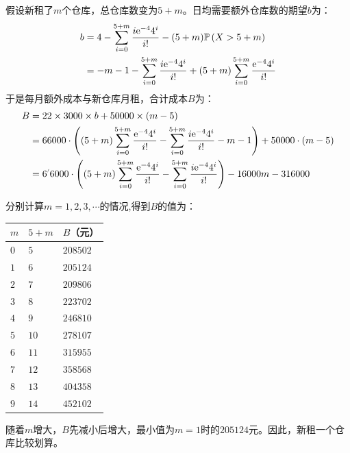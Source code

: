 \documentclass[12pt,UTF8,fontset=none]{ctexbook}
\begin{document}
\begin{so}
    假设新租了$m$个仓库，总仓库数变为$5+m$。日均需要额外仓库数的期望$b$为：
    \begin{align*}
        b &= 4 - \sum_{i=0}^{5+m} \frac{i\mathrm{e}^{-4}4^i}{i!} - (5+m) \mathbb{P}\left(X>5+m\right) \\
        &= -m - 1 - \sum_{i=0}^{5+m} \frac{i\mathrm{e}^{-4}4^i}{i!} + (5+m) \sum_{i=0}^{5+m} \frac{\mathrm{e}^{-4}4^i}{i!}
    \end{align*}
    于是每月额外成本与新仓库月租，合计成本$B$为：
    \begin{align*}
        B =\; & 22 \times 3000 \times b + 50000 \times (m - 5) \\
        =\;& 66000\cdot \left( (5+m) \sum_{i=0}^{5+m} \frac{\e^{-4}4^i}{i!} - \sum_{i=0}^{5+m} \frac{i\e^{-4}4^i}{i!}  -m - 1\right) + 50000 \cdot (m - 5) \\
        =\;& 6\dlim{6000}\cdot \left((5+m) \sum_{i=0}^{5+m} \frac{\e^{-4}4^i}{i!} - \sum_{i=0}^{5+m} \frac{i\e^{-4}4^i}{i!}\right) -16000 m - 316000 
    \end{align*}
    
    分别计算$m=1,2,3,\cdots$的情况,得到$B$的值为：
    \begin{center}
        \begin{tabular}{  | p{3em}<{\centering} | p{6em}<{\centering} | p{6em}<{\centering} | }
            \hline
            $m$ & $5+m$ & $B$（元） \\
            \hline
            $0$ & $5$ & $208502$\\
            \hline 
            $1$ & $6$ & $205124$ \\
            \hline 
            $2$ & $7$ & $209806$\\
            \hline 
            $3$ & $8$ & $223702$ \\
            \hline 
            $4$ & $9$ & $246810$ \\
            \hline 
            $5$ & $10$ & $278107$ \\
            \hline 
            $6$ & $11$ & $315955$ \\
            \hline 
            $7$ & $12$ & $358568$ \\
            \hline 
            $8$ & $13$ & $404358$ \\
            \hline
            $9$ & $14$ & $452102$ \\
            \hline
        \end{tabular}
    \end{center}
    随着$m$增大，$B$先减小后增大，最小值为$m=1$时的$205124$元。因此，新租一个仓库比较划算。
\end{so}
\end{document}
